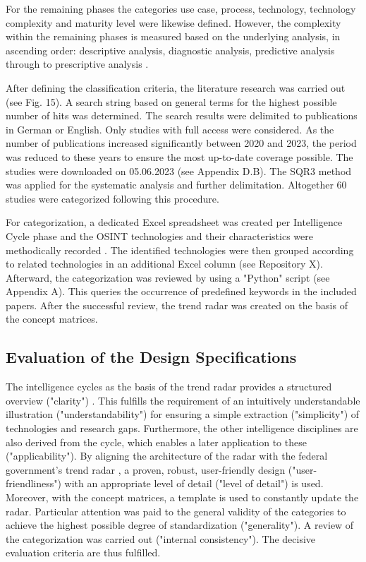 \documentclass[10pt]{article}
\begin{document}
For the remaining phases the categories use case, process,
technology, technology complexity and maturity level
were likewise defined. However, the complexity within the remaining
phases is measured based on the underlying analysis, in
ascending order: descriptive analysis, diagnostic analysis, predictive
analysis through to prescriptive analysis \cite{Delen.2013,GartnerGmbH.2012}.

After defining the classification criteria, the literature research
was carried out (see Fig. 15). A search string based on
general terms for the highest possible number of hits was determined.
The search results were delimited to publications in German or English. Only studies
with full access were considered. As the number of publications
increased significantly between 2020 and 2023, the period was reduced
to these years to ensure the most up-to-date coverage possible.
The studies were downloaded on 05.06.2023 (see Appendix D.B). The
SQR3 method \cite{Robinson.1970} was applied for the systematic analysis and further
delimitation. Altogether 60 studies were categorized following this
procedure.

For categorization, a dedicated Excel spreadsheet was created per
Intelligence Cycle phase and the OSINT technologies and their
characteristics were methodically recorded \cite{Cleven.2009, Webster.2002}. The identified
technologies were then grouped according to related technologies in an
additional Excel column (see Repository X). Afterward, the categorization was
reviewed by using a "Python" script (see Appendix A). This
queries the occurrence of predefined keywords in the included papers.
After the successful review, the trend radar was created on the basis of the concept matrices.

\subsection{Evaluation of the Design Specifications}

The intelligence cycles as the basis of the trend radar provides a
structured overview ("clarity") \cite{Breakspear.2013}. This
fulfills the requirement of an intuitively understandable illustration
("understandability") for ensuring a simple extraction ("simplicity")
of technologies and research gaps. Furthermore, the other intelligence
disciplines are also derived from the cycle, which enables a later
application to these ("applicability"). By aligning the
architecture of the radar with the federal government's trend radar
\cite{Stich.2022}, a proven, robust, user-friendly
design ("user-friendliness") with an appropriate level of detail
("level of detail") is used. Moreover, with the concept matrices, a
template is used to constantly update the radar. Particular attention
was paid to the general validity of the categories to achieve
the highest possible degree of standardization ("generality").
A review of the categorization was carried out ("internal consistency").
The decisive evaluation criteria \cite{vomBrocke.2020b} are thus fulfilled.
\end{document}
